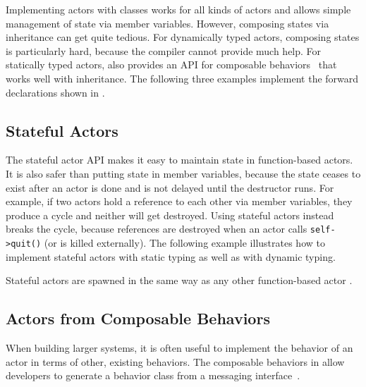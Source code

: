 Implementing actors with classes works for all kinds of actors and allows simple management of state via member variables. However, composing states via inheritance can get quite tedious. For dynamically typed actors, composing states is particularly hard, because the compiler cannot provide much help. For statically typed actors, \lib also provides an API for composable behaviors~ that works well with inheritance. The following three examples implement the forward declarations shown in .



\clearpage
\subsection{Stateful Actors}
\label{stateful-actor}

The stateful actor API makes it easy to maintain state in function-based actors. It is also safer than putting state in member variables, because the state ceases to exist after an actor is done and is not delayed until the destructor runs. For example, if two actors hold a reference to each other via member variables, they produce a cycle and neither will get destroyed. Using stateful actors instead breaks the cycle, because references are destroyed when an actor calls \lstinline^self->quit()^ (or is killed externally). The following example illustrates how to implement stateful actors with static typing as well as with dynamic typing.



Stateful actors are spawned in the same way as any other function-based actor .



\clearpage
\subsection{Actors from Composable Behaviors \experimental}
\label{composable-behavior}

When building larger systems, it is often useful to implement the behavior of an actor in terms of other, existing behaviors. The composable behaviors in \lib allow developers to generate a behavior class from a messaging interface~.

